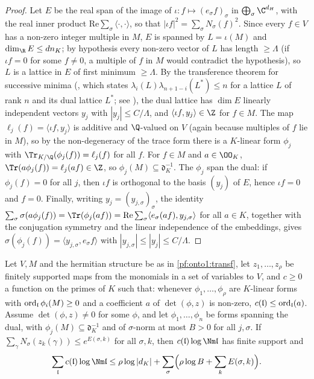 \begin{proof}
Let $E$ be the real span of the image of $\iota\colon f\mapsto(e_\sigma f)_\sigma$ in $\bigoplus_\sigma\C^{d_H}$, with the real
inner product $\mathrm{Re}\sum_\sigma\langle\cdot,\cdot\rangle$, so that $|\iota f|^2=\sum_\sigma N_\sigma(f)^2$. Since every $f\in V$
has a non-zero integer multiple in $M$, $E$ is spanned by $L=\iota(M)$ and $\dim_\R E\le dn_K$; by hypothesis every non-zero
vector of $L$ has length $\ge\Lambda$ (if $\iota f=0$ for some $f\ne0$, a multiple of $f$ in $M$ would contradict the
hypothesis), so $L$ is a lattice in $E$ of first minimum $\ge\Lambda$. By the transference theorem for successive minima
(, which states $\lambda_i(L)\lambda_{n+1-i}(L^*)\le n$ for a lattice $L$ of rank
$n$ and its dual lattice $L^*$; see \cite{Banaszczyk1993}), the dual lattice has $\dim E$ linearly independent vectors
$y_j$ with $|y_j|\le C/\Lambda$, and $\langle\iota f,y_j\rangle\in\Z$ for $f\in M$. The map $\ell_j(f)=\langle\iota f,y_j\rangle$ is
additive and $\Q$-valued on $V$ (again because multiples of $f$ lie in $M$), so by the non-degeneracy of the trace form
there is a $K$-linear form $\phi_j$ with $\Tr_{K/\Q}(\phi_j(f))=\ell_j(f)$ for all $f$. For $f\in M$ and $a\in\OO_K$,
$\Tr(a\phi_j(f))=\ell_j(af)\in\Z$, so $\phi_j(M)\subseteq\mathfrak d_K^{-1}$. The $\phi_j$ span the dual: if $\phi_j(f)=0$ for all
$j$, then $\iota f$ is orthogonal to the basis $(y_j)$ of $E$, hence $\iota f=0$ and $f=0$. Finally, writing $y_j=(y_{j,\sigma})_\sigma$,
the identity $\sum_\sigma\sigma(a\phi_j(f))=\Tr(\phi_j(af))=\mathrm{Re}\sum_\sigma\langle e_\sigma(af),y_{j,\sigma}\rangle$ for all $a\in K$,
together with the conjugation symmetry and the linear independence of the embeddings, gives $\sigma(\phi_j(f))=\langle
y_{j,\sigma},e_\sigma f\rangle$ with $|y_{j,\sigma}|\le|y_j|\le C/\Lambda$.
\end{proof}

\begin{lemma}\label{pf:onto1:detcoef}
Let $V,M$ and the hermitian structure be as in \cref{pf:onto1:transf}, let $z_1,\dots,z_\rho$ be finitely supported maps from
the monomials in a set of variables to $V$, and $c\ge0$ a function on the primes of $K$ such that: whenever
$\phi_1,\dots,\phi_\rho$ are $K$-linear forms with $\operatorname{ord}_{\mathfrak l}\phi_i(M)\ge0$ and a coefficient $a$ of
$\det(\phi,z)$ is non-zero, $c(\mathfrak l)\le\operatorname{ord}_{\mathfrak l}(a)$. Assume $\det(\phi,z)\ne0$ for some $\phi$, and let
$\phi_1,\dots,\phi_n$ be forms spanning the dual, with $\phi_j(M)\subseteq\mathfrak d_K^{-1}$ and of $\sigma$-norm at most $B>0$ for all
$j,\sigma$. If $\sum_\gamma N_\sigma(z_k(\gamma))\le e^{E(\sigma,k)}$ for all $\sigma,k$, then $c(\mathfrak l)\log\Nm\mathfrak l$ has finite
support and
\[
\sum_{\mathfrak l}c(\mathfrak l)\log\Nm\mathfrak l\le\rho\log|d_K|+\sum_\sigma\Bigl(\rho\log B+\sum_kE(\sigma,k)\Bigr).
\]
\end{lemma}

